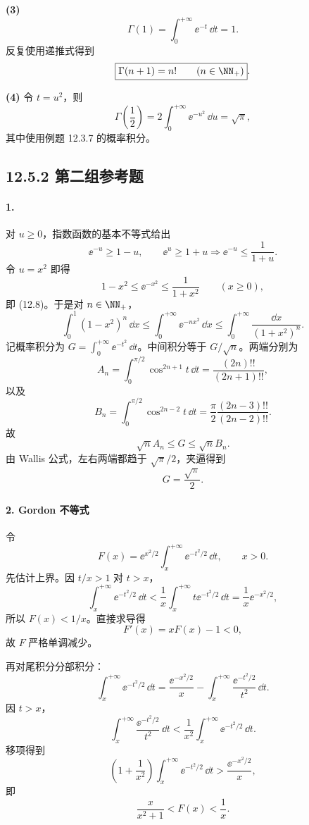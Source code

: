 \textbf{(3)}
\[
  \Gamma(1)=\int_0^{+\infty}\ee^{-t}\,\dd t=1.
\]
反复使用递推式得到
\[
  \boxed{\Gamma(n+1)=n!\qquad(n\in\NN_+)}.
\]

\textbf{(4)} 令 $t=u^2$，则
\[
  \Gamma\left(\frac12\right)
  =2\int_0^{+\infty}\ee^{-u^2}\,\dd u
  =\boxed{\sqrt\pi},
\]
其中使用例题 12.3.7 的概率积分。

\subsection*{12.5.2 第二组参考题}

\paragraph{1.}
对 $u\geq0$，指数函数的基本不等式给出
\[
  \ee^{-u}\geq1-u,
  \qquad
  \ee^u\geq1+u\Longrightarrow \ee^{-u}\leq\frac1{1+u}.
\]
令 $u=x^2$ 即得
\[
  1-x^2\leq\ee^{-x^2}\leq\frac1{1+x^2}\qquad(x\geq0),
\]
即 (12.8)。于是对 $n\in\NN_+$，
\[
  \int_0^1(1-x^2)^n\,\dd x
  \leq\int_0^{+\infty}\ee^{-nx^2}\,\dd x
  \leq\int_0^{+\infty}\frac{\dd x}{(1+x^2)^n}.
\]
记概率积分为 $G=\int_0^{+\infty}\ee^{-t^2}\,\dd t$。中间积分等于 $G/\sqrt n$。两端分别为
\[
  A_n=\int_0^{\pi/2}\cos^{2n+1}t\,\dd t
  =\frac{(2n)!!}{(2n+1)!!},
\]
以及
\[
  B_n=\int_0^{\pi/2}\cos^{2n-2}t\,\dd t
  =\frac\pi2\frac{(2n-3)!!}{(2n-2)!!}.
\]
故
\[
  \sqrt n A_n\leq G\leq\sqrt n B_n.
\]
由 Wallis 公式，左右两端都趋于 $\sqrt\pi/2$，夹逼得到
\[
  \boxed{G=\frac{\sqrt\pi}{2}}.
\]

\paragraph{2. Gordon 不等式}
令
\[
  F(x)=\ee^{x^2/2}\int_x^{+\infty}\ee^{-t^2/2}\,\dd t,
  \qquad x>0.
\]
先估计上界。因 $t/x>1$ 对 $t>x$，
\[
  \int_x^{+\infty}\ee^{-t^2/2}\,\dd t
  <\frac1x\int_x^{+\infty}t\ee^{-t^2/2}\,\dd t
  =\frac1x\ee^{-x^2/2},
\]
所以 $F(x)<1/x$。直接求导得
\[
  F'(x)=xF(x)-1<0,
\]
故 $F$ 严格单调减少。

再对尾积分分部积分：
\[
  \int_x^{+\infty}\ee^{-t^2/2}\,\dd t
  =\frac{\ee^{-x^2/2}}x-\int_x^{+\infty}\frac{\ee^{-t^2/2}}{t^2}\,\dd t.
\]
因 $t>x$，
\[
  \int_x^{+\infty}\frac{\ee^{-t^2/2}}{t^2}\,\dd t
  <\frac1{x^2}\int_x^{+\infty}\ee^{-t^2/2}\,\dd t.
\]
移项得到
\[
  \left(1+\frac1{x^2}\right)\int_x^{+\infty}\ee^{-t^2/2}\,\dd t
  >\frac{\ee^{-x^2/2}}x,
\]
即
\[
  \boxed{\frac{x}{x^2+1}<F(x)<\frac1x}.
\]

